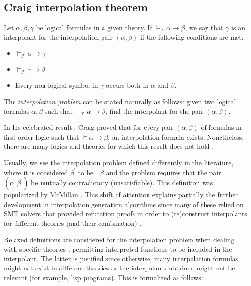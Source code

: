 \subsection{Craig interpolation theorem}

Let $\alpha, \beta, \gamma$ be logical formulas in a given theory. If
$\models_{\mathcal{T}} \alpha \rightarrow \beta$, we say that $\gamma$ is an
interpolant for the interpolation pair $(\alpha, \beta)$ if the following conditions
are met:

\begin{itemize}
  \item $\models_{\mathcal{T}} \alpha \rightarrow \gamma$
  \item $\models_{\mathcal{T}} \gamma \rightarrow \beta$
  \item Every non-logical symbol in $\gamma$ occurs both in $\alpha$ and
    $\beta$.
\end{itemize}

The \emph{interpolation problem} can be stated naturally as 
follows: given two logical formulas $\alpha, \beta$ such that 
$\models_{\mathcal{T}} \alpha \rightarrow \beta$, find
the interpolant for the pair $(\alpha, \beta)$.

In his celebrated result \cite{10.2307/2963594}, Craig proved that for every pair
$(\alpha, \beta)$ of formulas in first-order logic such that
$\models \alpha \rightarrow \beta$, an interpolation formula exists. Nonetheless,
there are many logics and theories for which this result does not hold \cite{komori1978}.

Usually, we see the interpolation problem defined 
differently in the literature, 
where it is considered $\beta^{'}$ to be $\neg \beta$ and 
the problem requires that the pair $(\alpha, \beta^{'})$
be mutually contradictory (unsatisfiable). 
This definition was popularized by 
McMillan \cite{10.1007/978-3-540-24730-2_2}. 
This shift of attention explains 
partially the further development in interpolation 
generation algorithms 
since many of these relied on SMT solvers that 
provided refutation proofs 
in order to (re)construct interpolants for different 
theories (and their 
combination) \cite{10.1007/978-3-642-02959-2_17, 
10.1007/978-3-642-36742-7_9, mcmillan2011interpolants}.

Relaxed definitions are considered for the interpolation 
problem when dealing with specific
theories \cite{10.1007/11532231_26}, permitting interpreted
functions to be included in the interpolant. The latter is 
justified since otherwise, many interpolation formulas might not exist
in different theories or the interpolants obtained might not 
be relevant (for example, lisp programs). This is formalized as follows:

